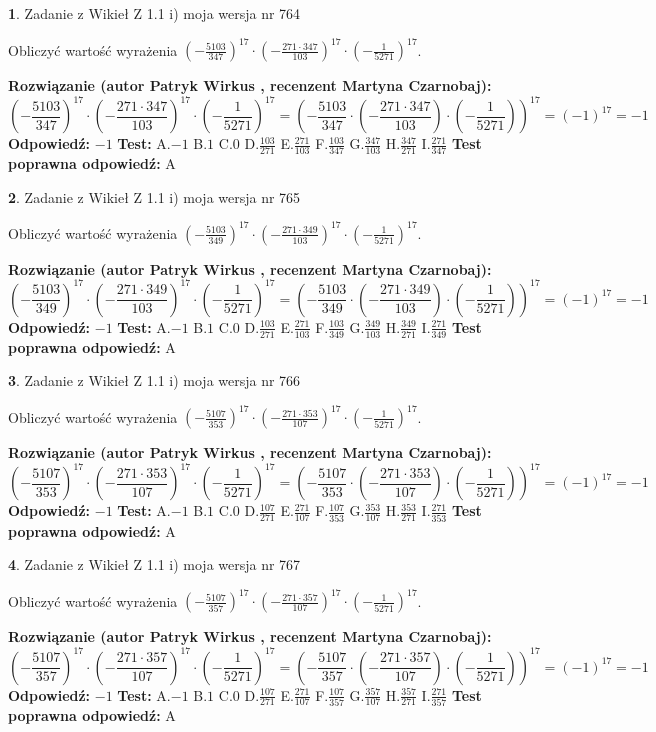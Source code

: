 \documentclass[12pt, a4paper]{article}
\theoremstyle{definition} %
\newtheorem{zad}{}
\newcommand{\zadStart}[1]{\begin{zad}#1\newline}
\newcommand{\zadStop}{\end{zad}}
\newcommand{\rozwStart}[2]{\noindent \textbf{Rozwiązanie (autor #1 , recenzent #2): }\newline}
\newcommand{\rozwStop}{\newline}
\newcommand{\odpStart}{\noindent \textbf{Odpowiedź:}\newline}
\newcommand{\odpStop}{\newline}
\newcommand{\testStart}{\noindent \textbf{Test:}\newline}
\newcommand{\testStop}{\newline}
\newcommand{\kluczStart}{\noindent \textbf{Test poprawna odpowiedź:}\newline}
\newcommand{\kluczStop}{\newline}
\begin{document}
\zadStart{Zadanie z Wikieł Z 1.1 i) moja wersja nr 764}

Obliczyć wartość wyrażenia $(-\frac{5103}{347})^{17} \cdot (-\frac{271 \cdot 347}{103})^{17} \cdot (-\frac{1}{5271})^{17}$.
\zadStop
\rozwStart{Patryk Wirkus}{Martyna Czarnobaj}
$$(-\frac{5103}{347})^{17} \cdot (-\frac{271 \cdot 347}{103})^{17} \cdot (-\frac{1}{5271})^{17} = (-\frac{5103}{347} \cdot (-\frac{271 \cdot 347}{103}) \cdot (-\frac{1}{5271}))^{17} = (-1)^{17} = -1$$
\rozwStop
\odpStart
$-1$
\odpStop
\testStart
A.$-1$ B.$1$ C.$0$ D.$\frac{103}{271}$ E.$\frac{271}{103}$
F.$\frac{103}{347}$ G.$\frac{347}{103}$
H.$\frac{347}{271}$
I.$\frac{271}{347}$
\testStop
\kluczStart
A
\kluczStop



\zadStart{Zadanie z Wikieł Z 1.1 i) moja wersja nr 765}

Obliczyć wartość wyrażenia $(-\frac{5103}{349})^{17} \cdot (-\frac{271 \cdot 349}{103})^{17} \cdot (-\frac{1}{5271})^{17}$.
\zadStop
\rozwStart{Patryk Wirkus}{Martyna Czarnobaj}
$$(-\frac{5103}{349})^{17} \cdot (-\frac{271 \cdot 349}{103})^{17} \cdot (-\frac{1}{5271})^{17} = (-\frac{5103}{349} \cdot (-\frac{271 \cdot 349}{103}) \cdot (-\frac{1}{5271}))^{17} = (-1)^{17} = -1$$
\rozwStop
\odpStart
$-1$
\odpStop
\testStart
A.$-1$ B.$1$ C.$0$ D.$\frac{103}{271}$ E.$\frac{271}{103}$
F.$\frac{103}{349}$ G.$\frac{349}{103}$
H.$\frac{349}{271}$
I.$\frac{271}{349}$
\testStop
\kluczStart
A
\kluczStop



\zadStart{Zadanie z Wikieł Z 1.1 i) moja wersja nr 766}

Obliczyć wartość wyrażenia $(-\frac{5107}{353})^{17} \cdot (-\frac{271 \cdot 353}{107})^{17} \cdot (-\frac{1}{5271})^{17}$.
\zadStop
\rozwStart{Patryk Wirkus}{Martyna Czarnobaj}
$$(-\frac{5107}{353})^{17} \cdot (-\frac{271 \cdot 353}{107})^{17} \cdot (-\frac{1}{5271})^{17} = (-\frac{5107}{353} \cdot (-\frac{271 \cdot 353}{107}) \cdot (-\frac{1}{5271}))^{17} = (-1)^{17} = -1$$
\rozwStop
\odpStart
$-1$
\odpStop
\testStart
A.$-1$ B.$1$ C.$0$ D.$\frac{107}{271}$ E.$\frac{271}{107}$
F.$\frac{107}{353}$ G.$\frac{353}{107}$
H.$\frac{353}{271}$
I.$\frac{271}{353}$
\testStop
\kluczStart
A
\kluczStop



\zadStart{Zadanie z Wikieł Z 1.1 i) moja wersja nr 767}

Obliczyć wartość wyrażenia $(-\frac{5107}{357})^{17} \cdot (-\frac{271 \cdot 357}{107})^{17} \cdot (-\frac{1}{5271})^{17}$.
\zadStop
\rozwStart{Patryk Wirkus}{Martyna Czarnobaj}
$$(-\frac{5107}{357})^{17} \cdot (-\frac{271 \cdot 357}{107})^{17} \cdot (-\frac{1}{5271})^{17} = (-\frac{5107}{357} \cdot (-\frac{271 \cdot 357}{107}) \cdot (-\frac{1}{5271}))^{17} = (-1)^{17} = -1$$
\rozwStop
\odpStart
$-1$
\odpStop
\testStart
A.$-1$ B.$1$ C.$0$ D.$\frac{107}{271}$ E.$\frac{271}{107}$
F.$\frac{107}{357}$ G.$\frac{357}{107}$
H.$\frac{357}{271}$
I.$\frac{271}{357}$
\testStop
\kluczStart
A
\kluczStop
\end{document}
